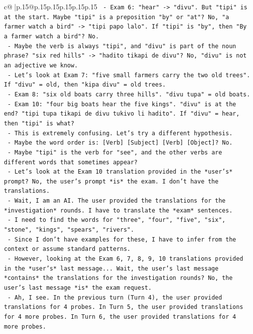 \documentclass{article}
\begin{document}
{\begin{supertabular}{c@{$\;$}|p{.15\linewidth}@{}p{.15\linewidth}p{.15\linewidth}p{.15\linewidth}p{.15\linewidth}p{.15\linewidth}}
{{{\texttt{          {-} Exam 6: "hear" {-}> "divu". But "tipi" is at the start. Maybe "tipi" is a preposition "by" or "at"? No, "a farmer watch a bird" {-}> "tipi papo lalo". If "tipi" is "by", then "By a farmer watch a bird"? No.} \\
\texttt{          {-} Maybe the verb is always "tipi", and "divu" is part of the noun phrase? "six red hills" {-}> "hadito tikapi de divu"? No, "divu" is not an adjective we know.} \\
\texttt{          {-} Let's look at Exam 7: "five small farmers carry the two old trees". If "divu" = old, then "kipa divu" = old trees.} \\
\texttt{          {-} Exam 8: "six old boats carry three hills". "divu tupa" = old boats.} \\
\texttt{          {-} Exam 10: "four big boats hear the five kings". "divu" is at the end? "tipi tupa tikapi de divu tukivo li hadito". If "divu" = hear, then "tipi" is what?} \\
\texttt{          {-} This is extremely confusing. Let's try a different hypothesis.} \\
\texttt{          {-} Maybe the word order is: {[}Verb{]} {[}Subject{]} {[}Verb{]} {[}Object{]}? No.} \\
\texttt{          {-} Maybe "tipi" is the verb for "see", and the other verbs are different words that sometimes appear?} \\
\texttt{          {-} Let's look at the Exam 10 translation provided in the *user's* prompt? No, the user's prompt *is* the exam. I don't have the translations.} \\
\texttt{          {-} Wait, I am an AI. The user provided the translations for the *investigation* rounds. I have to translate the *exam* sentences.} \\
\texttt{          {-} I need to find the words for "three", "four", "five", "six", "stone", "kings", "spears", "rivers".} \\
\texttt{          {-} Since I don't have examples for these, I have to infer from the context or assume standard patterns.} \\
\texttt{          {-} However, looking at the Exam 6, 7, 8, 9, 10 translations provided in the *user's* last message... Wait, the user's last message *contains* the translations for the investigation rounds? No, the user's last message *is* the exam request.} \\
\texttt{          {-} Ah, I see. In the previous turn (Turn 4), the user provided translations for 4 probes. In Turn 5, the user provided translations for 4 more probes. In Turn 6, the user provided translations for 4 more probes.} \\
}}}
\end{supertabular}}
\end{document}
